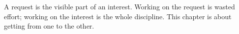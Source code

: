 
\begin{chapterblurb}
A request is the visible part of an interest. Working on the request is wasted effort; working on the interest is the whole discipline. This chapter is about getting from one to the other.
\end{chapterblurb}
